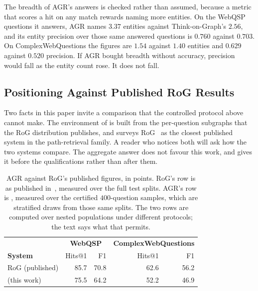 The breadth of AGR's answers is checked rather than assumed, because a
metric that scores a hit on any match rewards naming more entities. On
the WebQSP questions it answers, AGR names $3.37$ entities against
Think-on-Graph's $2.56$, and its entity precision over those same
answered questions is $0.760$ against $0.703$. On ComplexWebQuestions
the figures are $1.54$ against $1.40$ entities and $0.629$ against
$0.520$ precision. If AGR bought breadth without accuracy, precision
would fall as the entity count rose. It does not fall.

\subsection{Positioning Against Published RoG Results}\label{sec:rog}

Two facts in this paper invite a comparison that the controlled protocol
above cannot make. The environment of  is built
from the per-question subgraphs that the RoG distribution publishes, and
 surveys RoG~\cite{luo2024reasoning} as the
closest published system in the path-retrieval family. A reader who
notices both will ask how the two systems compare. The aggregate answer
does not favour this work, and  gives it before the
qualifications rather than after them.

\begin{table}[!tb]
  \begin{center}
    \caption{AGR against RoG's published figures, in points. RoG's row
      is as published in~\cite{luo2024reasoning}, measured over the
      full test splits. AGR's row is , measured over the
      certified $400$-question samples, which are stratified draws from
      those same splits. The two rows are computed over nested
      populations under different protocols; the text says what that
      permits.}
    \label{tab:rog}
    \footnotesize
    \begin{tabular}{|l|rr|rr|}
      \hline
      & \multicolumn{2}{c|}{\textbf{WebQSP}}
      & \multicolumn{2}{c|}{\textbf{ComplexWebQuestions}} \\
      \textbf{System} & Hits@1 & F1 & Hits@1 & F1 \\
      \hline
      RoG (published)    & 85.7 & 70.8 & 62.6 & 56.2 \\
      \agr{} (this work) & 75.5 & 64.2 & 52.2 & 46.9 \\
      \hline
    \end{tabular}
  \end{center}
\end{table}

